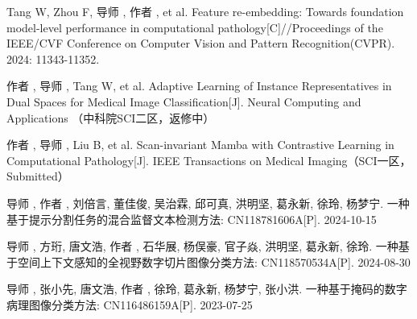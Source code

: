 {
\small
\setlength{\baselineskip}{20pt}
\begin{enumerate}[label={[\arabic*]}, leftmargin=*]
\item Tang W, Zhou F, 导师 , 作者 , et al. Feature re-embedding: Towards foundation model-level performance in computational pathology[C]//Proceedings of the IEEE/CVF Conference on Computer Vision and Pattern Recognition(CVPR). 2024: 11343-11352. 
\item 作者 , 导师 , Tang W,  et al. Adaptive Learning of Instance Representatives in Dual Spaces for Medical Image Classification[J]. Neural Computing and Applications （中科院SCI二区，返修中）
\item 作者 , 导师 , Liu B, et al. Scan-invariant Mamba with Contrastive Learning in Computational Pathology[J]. IEEE Transactions on Medical Imaging（SCI一区，Submitted）
\item 导师 , 作者 , 刘倍言, 董佳俊, 吴治霖, 邱可真, 洪明坚, 葛永新, 徐玲, 杨梦宁. 一种基于提示分割任务的混合监督文本检测方法: CN118781606A[P]. 2024-10-15
\item 导师 , 方珩, 唐文浩, 作者 , 石华展, 杨俣豪, 官子焱, 洪明坚, 葛永新, 徐玲. 一种基于空间上下文感知的全视野数字切片图像分类方法: CN118570534A[P]. 2024-08-30
\item 导师 ,  张小先, 唐文浩, 作者 , 徐玲, 葛永新, 杨梦宁, 张小洪. 一种基于掩码的数字病理图像分类方法: CN116486159A[P]. 2023-07-25
\end{enumerate}
}


